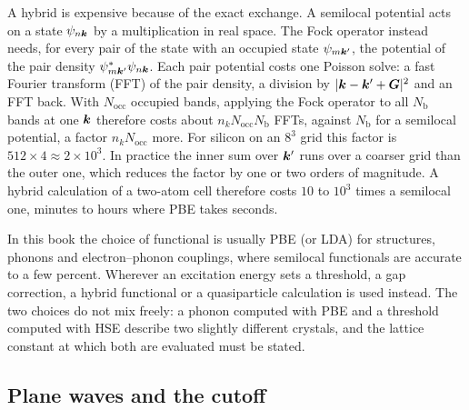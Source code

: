 A hybrid is expensive because of the exact exchange. A semilocal potential acts on a state $\psi_{n\bm{k}}$ by a multiplication in real space. The Fock operator instead needs, for every pair of the state with an occupied state $\psi_{m\bm{k}'}$, the potential of the pair density $\psi^*_{m\bm{k}'}\psi_{n\bm{k}}$. Each pair potential costs one Poisson solve: a fast Fourier transform (FFT) of the pair density, a division by $|\bm{k} - \bm{k}' + \bm{G}|^2$ and an FFT back. With $N_{\mathrm{occ}}$ occupied bands, applying the Fock operator to all $N_{\mathrm{b}}$ bands at one $\bm{k}$ therefore costs about $n_kN_{\mathrm{occ}}N_{\mathrm{b}}$ FFTs, against $N_{\mathrm{b}}$ for a semilocal potential, a factor $n_kN_{\mathrm{occ}}$ more. For silicon on an $8^3$ grid this factor is $512\times4 \approx 2\times10^3$. In practice the inner sum over $\bm{k}'$ runs over a coarser grid than the outer one, which reduces the factor by one or two orders of magnitude. A hybrid calculation of a two-atom cell therefore costs $10$ to $10^3$ times a semilocal one, minutes to hours where PBE takes seconds.

In this book the choice of functional is usually PBE (or LDA) for structures, phonons and electron--phonon couplings, where semilocal functionals are accurate to a few percent. Wherever an excitation energy sets a threshold, a gap correction, a hybrid functional or a quasiparticle calculation is used instead. The two choices do not mix freely: a phonon computed with PBE and a threshold computed with HSE describe two slightly different crystals, and the lattice constant at which both are evaluated must be stated.

\subsection{Plane waves and the cutoff}

